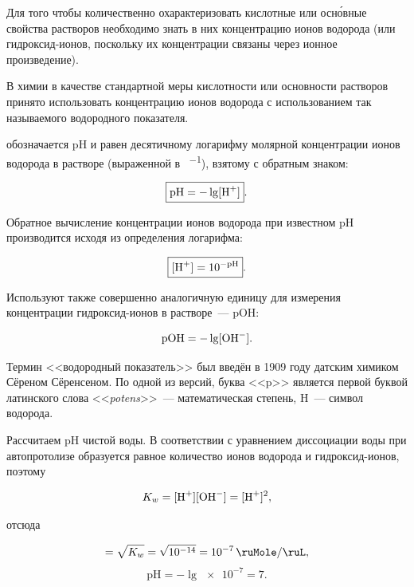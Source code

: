 Для того чтобы количественно охарактеризовать кислотные или осн\'{о}вные свойства растворов необходимо знать в них концентрацию ионов водорода (или гидроксид-ионов, поскольку их концентрации связаны через ионное произведение).

В химии в качестве стандартной меры кислотности или основности растворов принято использовать концентрацию ионов водорода с использованием так называемого водородного показателя.

 обозначается pH и равен десятичному логарифму молярной концентрации ионов водорода в растворе (выраженной в \unit{\ruMole\per\ruL}), взятому с обратным знаком:

\begin{equation*}
    \boxed{\text{pH} = -\lg[\ce{H^+}]}.
\end{equation*}

Обратное вычисление концентрации ионов водорода при известном pH производится исходя из определения логарифма:

\begin{equation*}
    \boxed{[\ce{H^+}] = 10^{-\text{pH}}}.
\end{equation*}

Используют также совершенно аналогичную единицу для измерения концентрации гидроксид-ионов в растворе~--- pOH:

\begin{equation*}
    \text{pOH} = -\lg[\ce{OH^-}].
\end{equation*}

Термин <<водородный показатель>> был введён в 1909 году датским химиком Сёреном Сёренсеном. По одной из версий, буква <<p>> является первой буквой латинского слова <<\textit{potens}>>~--- математическая степень, H~--- символ водорода.

Рассчитаем pH чистой воды. В соответствии с уравнением диссоциации воды при автопротолизе образуется равное количество ионов водорода и гидроксид-ионов, поэтому

\begin{equation*}
    K_w = [\ce{H^+}][\ce{OH^-}] = [\ce{H^+}]^2,
\end{equation*}

отсюда

\begin{equation*}
    [\ce{H^+}] = \sqrt{K_w} = \sqrt{\num{e-14}} = \qty{e-7}{\ruMole\per\ruL},
\end{equation*}
\begin{equation*}
    \text{pH} = -\lg\num{e-7} = 7.
\end{equation*}


